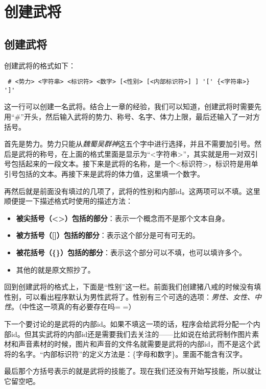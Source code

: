 \chapter{创建武将}

\section{创建武将}

创建武将的格式如下： \\

\begin{verbatim}
 # <势力> <字符串> <标识符> <数字> [<性别> [<内部标识符>] ] '[' {<字符串>} ']'
\end{verbatim}

这一行可以创建一名武将。结合上一章的经验，我们可以知道，创建武将时需要先用“\#”开头，然后输入武将的势力、称号、名字、体力上限，最后还输入了一对方括号。

首先是势力。势力只能从\emph{魏蜀吴群神}这五个字中进行选择，并且不需要加引号。然后是武将的称号，在上面的格式里面是显示为“<字符串>”，其实就是用一对双引号包括起来的一段文本。接下来是武将的名称，是一个<标识符>，标识符是用单引号包括的文本。再接下来是武将的体力值，这里填一个数字。

再然后就是前面没有填过的几项了，武将的性别和内部id。这两项可以不填。这里顺便提一下描述格式时使用的描述方法：

\begin{itemize}
 \item \textbf{被尖括号（<>）包括的部分}：表示一个概念而不是那个文本自身。
 \item \textbf{被方括号（[]）包括的部分}：表示这个部分是可有可无的。
 \item \textbf{被花括号（\{\}）包括的部分}：表示这个部分可以不填，也可以填许多个。
 \item 其他的就是原文照抄了。
\end{itemize}

回到创建武将的格式上，下面是“性别”这一栏。前面我们创建猪八戒的时候没有填性别，可以看出程序默认为男性武将了。性别有三个可选的选项：\emph{男性、女性、中性}。（中性这一项真的有必要存在吗= =）

下一个要讨论的是武将的内部id。如果不填这一项的话，程序会给武将分配一个内部id。但其实武将的内部id还是需要我们去关注的——比如说在给武将制作图片素材和声音素材的时候，图片和声音的文件名就需要是武将的内部id，而不是这个武将的名字。“内部标识符”的定义方法是：\{字母和数字\}。里面不能含有汉字。

最后那个方括号表示的就是武将的技能了。现在我们还没有开始写技能，所以就让它留空吧。\\

